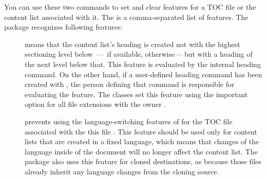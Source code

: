 \begin{Declaration}
\end{Declaration}
You can use these two commands to set and clear features for a TOC file
 or the content list associated with it. The  is a comma-separated list of features. The  package
recognizes following features:
\begin{description}
\item[] means that the content list's heading is created not
  with the highest sectioning level below
  \,---\, if available,
   otherwise\,---\,but with a heading of the next
  level below that. This feature is evaluated by the internal heading command.
  On the other hand, if a user-defined heading command has been created with
  , the person defining that command is
  responsible for evaluating the feature. The \KOMAScript{} classes set this
  feature using the %
  important{}%
   option for all file extensions
  with the owner .
\item[] prevents using the language-switching features of
   for the TOC file associated with the
  this file . This feature should be used only for content
  lists that are created in a fixed language, which means that changes of the
  language inside of the document will no longer affect the content list. The
  \cite{package:scrwfile} package also uses this feature for cloned
  destinations, as because those files already inherit any language changes
  from the cloning source.


\end{description}
